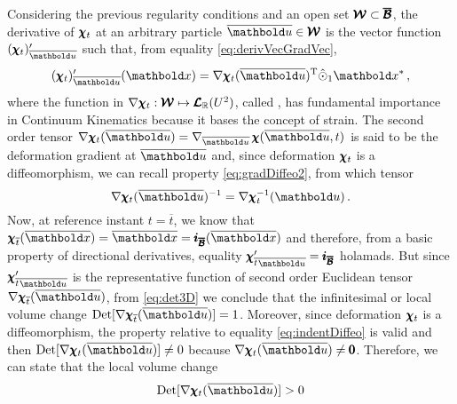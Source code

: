 Considering the previous regularity conditions and an open set $\pmb{\mathcal{W}}\subset\pmb{\overline{\mathcal{B}}}$, the derivative of $\pmb{\chi}_t$ at an arbitrary particle $\overline{\vto{u}}\in\pmb{\mathcal{W}}$ is the vector function $(\tnr{\chi}_t)'_{\overline{\vto{u}}}$ such that, from equality \eqref{eq:derivVecGradVec}, 
\begin{equation}
\fua{(\tnr{\chi}_t)'_{\overline{\vto{u}}}}{\vto{x}}= \fua{ \nabla\tnr{\chi}_t}{\overline{\vto{u}}}^{\text{T}}\hat{\odot}_1\vto{x}^*\,,
\end{equation}
where the function in $\nabla\pmb{\chi}_t : \pmb{\mathcal{W}} \mapsto \pmb{\mathcal{L}}_{\mathbb{R}}(U^{2})$, called , has fundamental importance in Continuum Kinematics because it bases the concept of strain. The second order tensor $\fua{ \nabla\tnr{\chi}_t}{\overline{\vto{u}}}=\fua{ \nabla_{\overline{\vto{u}}}\,\tnr{\chi}}{\overline{\vto{u}},t}$ is said to be the deformation gradient at $\overline{\vto{u}}$ and, since deformation $\pmb{\chi}_t$ is a diffeomorphism, we can recall property \eqref{eq:gradDiffeo2}, from which tensor
\begin{equation}\label{eq:invGradDef}
\fua{\nabla\tnr{\chi}_t}{\overline{\vto{u}}}^{-1} = \fua{\nabla\tnr{\chi}_t^{-1}}{\vto{u}}\,.
\end{equation}
Now, at reference instant $t=\overline{t}$, we know that $\tnr{\chi}_{\overline{t}}(\overline{\vto{x}})=\overline{\vto{x}}=\tnr{i}_{\tnr{\overline{\mathcal{B}}}}(\overline{\vto{x}})$ and therefore, from a basic property of directional derivatives, equality ${\tnr{\chi}'_{\overline{t}} }_{\overline{\vto{u}}}=\tnr{i}_{\tnr{\overline{\mathcal{B}}}}$ holamads. But since ${\tnr{\chi}'_{\overline{t}} }_{\overline{\vto{u}}}$ is the representative function of second order Euclidean tensor $\fua{\nabla\tnr{\chi}_{\overline{t}}}{\overline{\vto{u}}}$, from \eqref{eq:det3D} we conclude that the infinitesimal or local volume change $\textnormal{Det}[\fua{\nabla\tnr{\chi}_{\overline{t}}}{\overline{\vto{u}}}]=1$. Moreover, since deformation $\pmb{\chi}_{t}$ is a diffeomorphism, the property relative to equality \eqref{eq:indentDiffeo} is valid and then $\textnormal{Det}[\fua{\nabla\tnr{\chi}_{t}}{\overline{\vto{u}}}]\neq 0$ because $\fua{\nabla\tnr{\chi}_{t}}{\overline{\vto{u}}}\neq \tnr{0}$. Therefore, we can state that the local volume change       
\begin{equation}\label{eq:detPositive}
\textnormal{Det}[\fua{\nabla\tnr{\chi}_t}{\overline{\vto{u}}}]>0
\end{equation}
